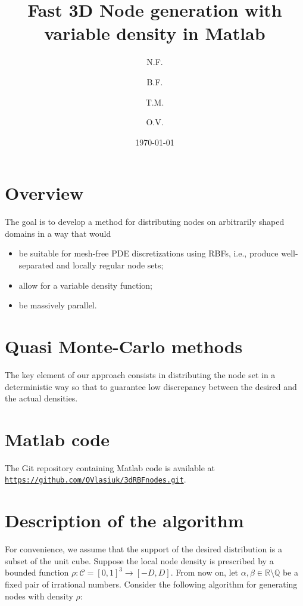 \documentclass[10pt]{amsart}
\title{Fast 3D Node generation with variable density in Matlab}
\author{N.F.}
\author{B.F.}
\author{T.M.}
\author{O.V.}
\date{\today}
\begin{document}
\maketitle

\section{Overview}

The goal is to develop a method for distributing nodes on arbitrarily shaped domains in a way that would 
\begin{itemize}
 \item be suitable for mesh-free PDE discretizations using RBFs, i.e., produce well-separated and locally regular node sets;
 \item allow for a variable density function;
 \item be massively parallel.
\end{itemize}

\section{Quasi Monte-Carlo methods}

The key element of our approach consists in distributing the node set in a deterministic way so that to guarantee low discrepancy between the desired and the actual densities.



\section{Matlab code}

The Git repository containing Matlab code is available at  \texttt{\url{https://github.com/OVlasiuk/3dRBFnodes.git}}.

\section{Description of the algorithm}

For convenience, we assume that the support of the desired distribution is a subset of the unit cube. Suppose the local node density is prescribed by a bounded function $\rho: \mathcal{C} =[0,1]^3 \to [-D,D]$. From now on, let $ \alpha, \beta\in\mathbb{R}\setminus\mathbb{Q} $ be a fixed pair of irrational numbers. Consider the following algorithm for generating nodes with density $ \rho $:  
\end{document}

